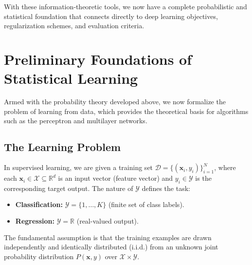 \documentclass{tufte-handout}
\begin{document}
\begin{marginfigure}
\centering
{}
\caption{Information bottleneck curve: find $Z$ maximizing $I(Z;Y)$ while minimizing $I(X;Z)$.}
\end{marginfigure}

With these information‑theoretic tools, we now have a complete probabilistic and statistical foundation that connects directly to deep learning objectives, regularization schemes, and evaluation criteria.

\section{Preliminary Foundations of Statistical Learning}

Armed with the probability theory developed above, we now formalize the problem of learning from data, which provides the theoretical basis for algorithms such as the perceptron and multilayer networks.

\subsection{The Learning Problem}

In supervised learning, we are given a training set $\mathcal{D} = \{(\mathbf{x}_i, y_i)\}_{i=1}^{N}$, where each $\mathbf{x}_i \in \mathcal{X} \subseteq \mathbb{R}^d$ is an input vector (feature vector) and $y_i \in \mathcal{Y}$ is the corresponding target output. The nature of $\mathcal{Y}$ defines the task:
\begin{itemize}
    \item \textbf{Classification:} $\mathcal{Y} = \{1,\dots, K\}$ (finite set of class labels).
    \item \textbf{Regression:} $\mathcal{Y} = \mathbb{R}$ (real-valued output).
\end{itemize}

The fundamental assumption is that the training examples are drawn independently and identically distributed (i.i.d.) from an unknown joint probability distribution $P(\mathbf{x}, y)$ over $\mathcal{X} \times \mathcal{Y}$.
\end{document}

